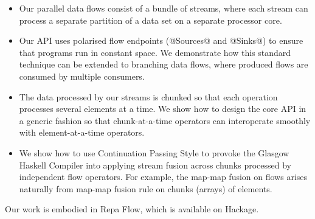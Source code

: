\begin{itemize}
\item Our parallel data flows consist of a bundle of streams, where each stream can process a separate partition of a data set on a separate processor core.

\item Our API uses polarised flow endpoints (@Sources@ and @Sinks@) to ensure that programs run in constant space. We demonstrate how this standard technique can be extended to branching data flows, where produced flows are consumed by multiple consumers.

\item The data processed by our streams is chunked so that each operation processes several elements at a time. We show how to design the core API in a generic fashion so that chunk-at-a-time operators can interoperate smoothly with element-at-a-time operators.

\item We show how to use Continuation Passing Style to provoke the Glasgow Haskell Compiler into applying stream fusion across chunks processed by independent flow operators. For example, the map-map fusion on flows arises naturally from map-map fusion rule on chunks (arrays) of elements.
\end{itemize}

Our work is embodied in Repa Flow, which is available on Hackage.

